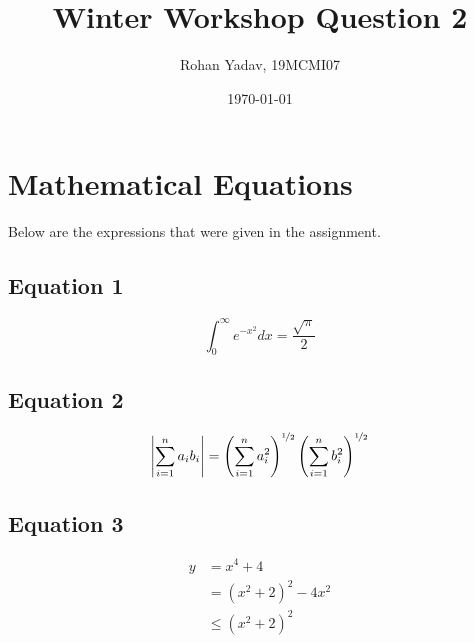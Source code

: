 \documentclass{article}
\title{Winter Workshop Question 2}
\author{Rohan Yadav, 19MCMI07}
\date{\today}
\begin{document}
    \maketitle

    \section{Mathematical Equations}
        Below are the expressions that were given in the assignment.
        \subsection{Equation 1}
            $$ \int_{0}^{\infty} e^{-x^2} dx = \frac{\sqrt{\pi}}{2} $$
        
        \subsection{Equation 2}
            $$ \left| \sum_{i=1}^{n} a_i b_i \right| = \left( \sum_{i=1}^{n} a_{i}^{2} \right)^{\nicefrac{1}{2}} \left( \sum_{i=1}^{n} b_{i}^{2} \right)^{\nicefrac{1}{2}} $$
            
        \subsection{Equation 3}
            \begin{equation}
            \begin{split}
            y & = x^4 + 4 \\
            & = (x^2 + 2)^2 - 4x^2 \\
            & \leq (x^2 + 2)^2
            \end{split}
        \end{equation}
\end{document}
